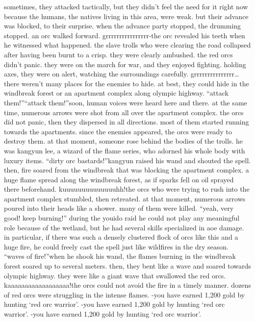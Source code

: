 sometimes, they attacked tactically, but they didn’t feel the need for it right now because the humans, the natives living in this area, were weak.
but their advance was blocked, to their surprise.
 when the advance party stopped, the drumming stopped.
 an orc walked forward.
grrrrrrrrrrrrrrrr-the orc revealed his teeth when he witnessed what happened.
 the slave trolls who were clearing the road collapsed after having been burnt to a crisp.
 they were clearly ambushed.
the red orcs didn’t panic.
 they were on the march for war, and they enjoyed fighting.
holding axes, they were on alert, watching the surroundings carefully.
grrrrrrrrrrrrrrr…there weren’t many places for the enemies to hide.
 at best, they could hide in the windbreak forest or an apartment complex along olympic highway.
“attack them!”“attack them!”soon, human voices were heard here and there.
 at the same time, numerous arrows were shot from all over the apartment complex.
 the orcs did not panic, then they dispersed in all directions.
 most of them started running towards the apartments.
 since the enemies appeared, the orcs were ready to destroy them.
at that moment, someone rose behind the bodies of the trolls.
 he was kangyun lee, a wizard of the flame series, who adorned his whole body with luxury items.
“dirty orc bastards!”kangyun raised his wand and shouted the spell.
 then, fire soared from the windbreak that was blocking the apartment complex.
a huge flame spread along the windbreak forest, as if sparks fell on oil sprayed there beforehand.
kuuuuuuuuuuuuuuhh!the orcs who were trying to rush into the apartment complex stumbled, then retreated.
at that moment, numerous arrows poured into their heads like a shower.
 many of them were killed.
“yeah, very good! keep burning!”
during the youido raid he could not play any meaningful role because of the wetland, but he had several skills specialized in aoe damage.
in particular, if there was such a densely clustered flock of orcs like this and a huge fire, he could freely cast the spell just like wildfires in the dry season.
“waves of fire!”when he shook his wand, the flames burning in the windbreak forest soared up to several meters.
 then, they bent like a wave and soared towards olympic highway.
they were like a giant wave that swallowed the red orcs.
kaaaaaaaaaaaaaaaaaa!the orcs could not avoid the fire in a timely manner.
 dozens of red orcs were struggling in the intense flames.
-you have earned 1,200 gold by hunting ‘red orc warrior’.
-you have earned 1,200 gold by hunting ‘red orc warrior’.
-you have earned 1,200 gold by hunting ‘red orc warrior’.
